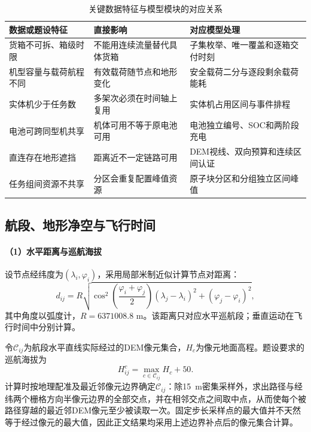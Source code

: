 \begin{table}[htbp]\centering
\caption{关键数据特征与模型模块的对应关系}\label{tab:feature-model}
\begin{tabularx}{\textwidth}{YY Y}
\toprule
数据或题设特征 & 直接影响 & 对应模型处理\\
\midrule
货箱不可拆、箱级时限 & 不能用连续流量替代具体货箱 & 子集枚举、唯一覆盖和逐箱交付时刻\\
机型容量与载荷航程不同 & 有效载荷随节点和地形变化 & 安全载荷二分与逐段剩余载荷能耗\\
实体机少于任务数 & 多架次必须在时间轴上复用 & 实体机占用区间与事件排程\\
电池可跨同型机共享 & 机体可用不等于原电池可用 & 电池独立编号、SOC和两阶段充电\\
直连存在地形遮挡 & 距离近不一定链路可用 & DEM视线、双向预算和连续区间认证\\
任务组间资源不共享 & 分区会重复配置峰值资源 & 原子块分区和分组独立区间峰值\\
\bottomrule
\end{tabularx}\end{table}

\subsection{航段、地形净空与飞行时间}
\paragraph{（1）水平距离与巡航海拔}
设节点经纬度为$(\lambda_i,\varphi_i)$，采用局部米制近似计算节点对距离：
\begin{equation}
d_{ij}=R\sqrt{\cos^2\!\left(\frac{\varphi_i+\varphi_j}{2}\right)(\lambda_j-\lambda_i)^2+(\varphi_j-\varphi_i)^2},
\end{equation}
其中角度以弧度计，$R=6371008.8$ m。该距离只对应水平巡航段；垂直运动在飞行时间中分别计算。

令$\mathcal C_{ij}$为航段水平直线实际经过的DEM像元集合，$H_c$为像元地面高程。题设要求的巡航海拔为
\begin{equation}
H_{ij}^{c}=\max_{c\in\mathcal C_{ij}}H_c+50.\label{eq:terrain}
\end{equation}
计算时按地理配准及最近邻像元边界确定$\mathcal C_{ij}$：除15~m密集采样外，求出路径与经纬两个栅格方向半像元边界的全部交点，并在相邻交点之间取中点，从而使每个被路径穿越的最近邻DEM像元至少被读取一次。固定步长采样点的最大值并不天然等于经过像元的最大值，因此正文结果均采用上述边界补点后的像元集合计算。

